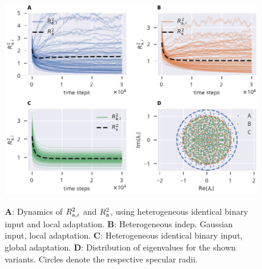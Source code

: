 \documentclass[12pt]{article}
\begin{document}
  \begin{figure}
    \includegraphics[width=5.78in]{./alt_hom_regulation_composite.pdf}
    \label{fig:alt_hom_regulation}
    \caption{{\bf A}: Dynamics of $R^2_{{\rm a},i}$ and $R^2_{\rm a}$,
     using heterogeneous identical binary input and local adaptation. 
     {\bf B}: Heterogeneous indep. Gaussian input, local adaptation. 
     {\bf C}: Heterogeneous identical binary input, global adaptation. 
     {\bf D}: Distribution of eigenvalues for the shown variants. 
     Circles denote the respective specular radii.}
  \end{figure}
\end{document}
